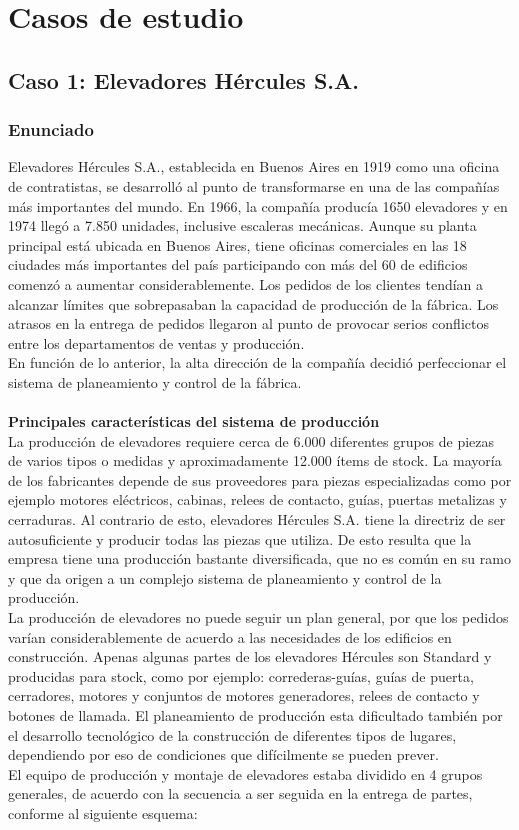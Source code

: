 \documentclass[a4paper,10pt]{article}
\begin{document}
\section{Casos de estudio}
	\subsection{Caso 1: Elevadores Hércules S.A.}
		\subsubsection{Enunciado}
		Elevadores Hércules S.A., establecida en Buenos Aires en 1919 como una oficina de
contratistas, se desarrolló al punto de transformarse en una de las compañías más
importantes del mundo. En 1966, la compañía producía 1650 elevadores y en 1974
llegó a 7.850 unidades, inclusive escaleras mecánicas. Aunque su planta principal está
ubicada en Buenos Aires, tiene oficinas comerciales en las 18 ciudades más importantes
del país participando con más del 60%
de edificios comenzó a aumentar considerablemente. Los pedidos de los clientes tendían
a alcanzar límites que sobrepasaban la capacidad de producción de la fábrica. Los
atrasos en la entrega de pedidos llegaron al punto de provocar serios conflictos entre los
departamentos de ventas y producción.\\
En función de lo anterior, la alta dirección de la compañía decidió perfeccionar el
sistema de planeamiento y control de la fábrica.\\ \\
\textbf{Principales características del sistema de producción}\\
La producción de elevadores requiere cerca de 6.000 diferentes grupos de piezas de
varios tipos o medidas y aproximadamente 12.000 ítems de stock. La mayoría de los
fabricantes depende de sus proveedores para piezas especializadas como por ejemplo
motores eléctricos, cabinas, relees de contacto, guías, puertas metalizas y cerraduras.
Al contrario de esto, elevadores Hércules S.A. tiene la directriz de ser autosuficiente y
producir todas las piezas que utiliza. De esto resulta que la empresa tiene una producción
bastante diversificada, que no es común en su ramo y que da origen a un complejo
sistema de planeamiento y control de la producción.\\
La producción de elevadores no puede seguir un plan general, por que los pedidos
varían considerablemente de acuerdo a las necesidades de los edificios en construcción.
Apenas algunas partes de los elevadores Hércules son Standard y producidas para stock,
como por ejemplo: correderas-guías, guías de puerta, cerradores, motores y conjuntos de
motores generadores, relees de contacto y botones de llamada. El planeamiento de
producción esta dificultado también por el desarrollo tecnológico de la construcción de
diferentes tipos de lugares, dependiendo por eso de condiciones que difícilmente se
pueden prever.\\
El equipo de producción y montaje de elevadores estaba dividido en 4 grupos generales,
de acuerdo con la secuencia a ser seguida en la entrega de partes, conforme al
siguiente esquema:
\end{document}
